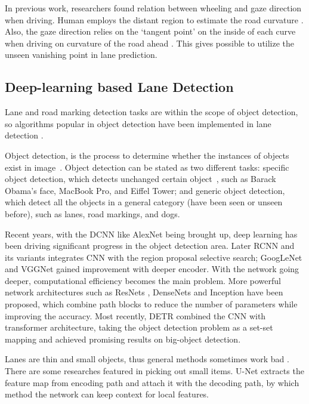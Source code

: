 \begin{spacing}{1.5}
In previous work, researchers found relation between wheeling and gaze direction when driving. Human employs the distant region to estimate the road curvature \cite{land1995parts}. Also, the gaze direction relies on the `tangent point' on the inside of each curve when driving on curvature of the road ahead \cite{land1994we}. This gives possible to utilize the unseen vanishing point in lane prediction.

\subsection{Deep-learning based Lane Detection}

Lane and road marking detection tasks are within the scope of object detection, so algorithms popular in object detection have been implemented in lane detection \cite{tang2020review}. 

Object detection, is the process to determine whether the instances of objects exist in image~\cite{liu2020deep}. Object detection can be stated as two different tasks: specific object detection, which detects unchanged certain object~\cite{zhang2013object}, such as Barack Obama’s face, MacBook Pro, and Eiffel Tower; and generic object detection, which detect all the objects in a general category (have been seen or unseen before), such as lanes, road markings, and dogs. 

Recent years, with the DCNN like AlexNet \cite{krizhevsky2012imagenet} being brought up, deep learning has been driving significant progress in the object detection area. Later RCNN and its variants \cite{girshick2014rich, girshick2015fast, ren2015faster} integrates CNN with the region proposal selective search; GoogLeNet \cite{szegedy2015going} and VGGNet \cite{simonyan2014very} gained improvement with deeper encoder. With the network going deeper, computational efficiency becomes the main problem. More powerful network architectures such as ResNets \cite{he2016deep}, DenseNets \cite{huang2017densely} and Inception \cite{ioffe2015batch} have been proposed, which combine path blocks to reduce the number of parameters while improving the accuracy. Most recently, DETR \cite{carion2020end} combined the CNN with transformer architecture, taking the object detection problem as a set-set mapping and achieved promising results on big-object detection.

Lanes are thin and small objects, thus general methods sometimes work bad \cite{tang2020review}. There are some researches featured in picking out small items. U-Net \cite{ronneberger2015unet} extracts the feature map from encoding path and attach it with the decoding path, by which method the network can keep context for local features.


\end{spacing}
